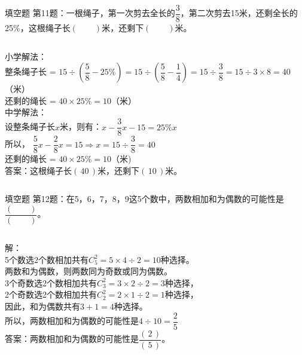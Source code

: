 \documentclass[aspectratio=169]{ctexbeamer} %
\begin{document}
\begin{frame}[t]{填空题}
第11题：一根绳子，第一次剪去全长的$\dfrac{3}{8}$，第二次剪去15米，还剩全长的25\%，这根绳子长$(\qquad)$米，还剩下$(\qquad)$米。
\pause
\vspace{1em}
\begin{columns}
小学解法：\\
整条绳子长 = $15 \div (\dfrac{5}{8} - 25\%) = 15 \div (\dfrac{5}{8} - \dfrac{1}{4}) = 15 \div \dfrac{3}{8} = 15 \div 3 \times 8 = 40$（米）\\
还剩的绳长 = $40 \times 25\% = 10$（米）\\
\vspace{1em}
中学解法：\\
设整条绳子长$x$米，则有：$x - \dfrac{3}{8}x - 15 = 25\% x $ \\
所以， $\dfrac{5}{8}x - \dfrac{2}{8}x = 15 \Rightarrow x = 15 \div \dfrac{3}{8} = 40$ \\
还剩的绳长 = $40 \times 25\% = 10$（米)\\
\vspace{1em}
答案：这根绳子长\alert{$(\, 40 \, )$}米，还剩下\alert{$(\, 10 \, )$}米。
\end{columns}
\end{frame}

\begin{frame}[t]{填空题}
第12题：在5，6，7，8，9这5个数中，两数相加和为偶数的可能性是$\dfrac{(\qquad)}{(\qquad)}$。
\pause
\vspace{1em}
\begin{columns}
解：\\
5个数选2个数相加共有$C_5^2 = 5 \times 4 \div 2 = 10$种选择。\\
两数和为偶数，则两数同为奇数或同为偶数。\\
3个奇数选2个数相加共有$C_3^2 = 3 \times 2 \div 2 = 3$种选择，\\
2个奇数选2个数相加共有$C_2^2 = 2 \times 1 \div 2 = 1$种选择，\\
因此，和为偶数共有$3 + 1 = 4$种选择。\\
所以，两数相加和为偶数的可能性是$ 4 \div 10 = \dfrac{2}{5}$ \\
\vspace{1em}
答案：两数相加和为偶数的可能性是\alert{$\dfrac{(\, 2 \, )}{(\, 5 \, )}$}。
\end{columns}
\end{frame}
\end{document}
